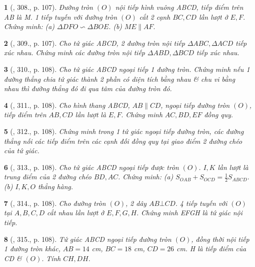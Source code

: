 \documentclass{article}
\newtheorem{baitoan}{}
\begin{document}
\begin{baitoan}[\cite{Binh_Toan_9_tap_2}, 308., p. 107]
	Đường tròn $(O)$ nội tiếp hình vuông ABCD, tiếp điểm trên AB là M. 1 tiếp tuyến với đường tròn $(O)$ cắt 2 cạnh $BC,CD$ lần lượt ở $E,F$. Chứng minh: (a) $\Delta DFO\backsim\Delta BOE$. (b) $ME\parallel AF$.
\end{baitoan}

\begin{baitoan}[\cite{Binh_Toan_9_tap_2}, 309., p. 107]
	Cho tứ giác ABCD, 2 đường tròn nội tiếp $\Delta ABC,\Delta ACD$ tiếp xúc nhau. Chứng minh các đường tròn nội tiếp $\Delta ABD,\Delta BCD$ tiếp xúc nhau.
\end{baitoan}

\begin{baitoan}[\cite{Binh_Toan_9_tap_2}, 310., p. 108]
	Cho tứ giác ABCD ngoại tiếp 1 đường tròn. Chứng minh nếu 1 đường thẳng chia tứ giác thành 2 phần có diện tích bằng nhau \& chu vi bằng nhau thì đường thẳng đó đi qua tâm của đường tròn đó.
\end{baitoan}

\begin{baitoan}[\cite{Binh_Toan_9_tap_2}, 311., p. 108]
	Cho hình thang ABCD, $AB\parallel CD$, ngoại tiếp đường tròn $(O)$, tiếp điểm trên $AB,CD$ lần lượt là $E,F$. Chứng minh $AC,BD,EF$ đồng quy.
\end{baitoan}

\begin{baitoan}[\cite{Binh_Toan_9_tap_2}, 312., p. 108]
	Chứng minh trong 1 tứ giác ngoại tiếp đường tròn, các đường thẳng nối các tiếp điểm trên các cạnh đối đồng quy tại giao điểm 2 đường chéo của tứ giác.
\end{baitoan}

\begin{baitoan}[\cite{Binh_Toan_9_tap_2}, 313., p. 108]
	Cho tứ giác ABCD ngoại tiếp được tròn $(O)$. $I,K$ lần lượt là trung điểm của 2 đường chéo $BD,AC$. Chứng minh: (a) $S_{OAB} + S_{OCD} = \frac{1}{2}S_{ABCD}$. (b) $I,K,O$ thẳng hàng.
\end{baitoan}

\begin{baitoan}[\cite{Binh_Toan_9_tap_2}, 314., p. 108]
	Cho đường tròn $(O)$, 2 dây $AB\bot CD$. 4 tiếp tuyến với $(O)$ tại $A,B,C,D$ cắt nhau lần lượt ở $E,F,G,H$. Chứng minh EFGH là tứ giác nội tiếp.
\end{baitoan}

\begin{baitoan}[\cite{Binh_Toan_9_tap_2}, 315., p. 108]
	Tứ giác ABCD ngoại tiếp đường tròn $(O)$, đồng thời nội tiếp 1 đường tròn khác, $AB = 14$ {\rm cm}, $BC = 18$ {\rm cm}, $CD = 26$ {\rm cm}. H là tiếp điểm của CD \& $(O)$. Tính $CH,DH$.
\end{baitoan}
\end{document}
